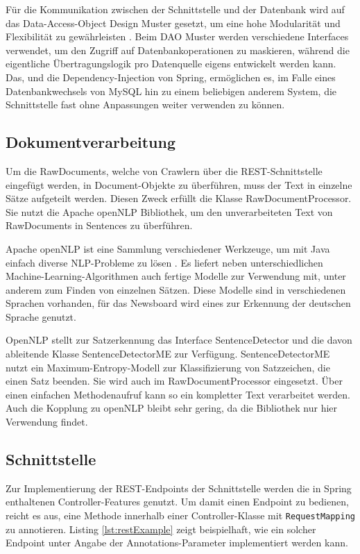 Für die Kommunikation zwischen der Schnittstelle und der Datenbank wird auf das
Data-Access-Object Design Muster gesetzt, um eine hohe Modularität und Flexibilität zu
gewährleisten \cite{dao-pattern}. Beim DAO Muster werden verschiedene Interfaces
verwendet, um den Zugriff auf Datenbankoperationen zu maskieren, während die eigentliche
Übertragungslogik pro Datenquelle eigens entwickelt werden kann. Das, und die
Dependency-Injection von Spring, ermöglichen es, im Falle eines Datenbankwechsels von
MySQL hin zu einem beliebigen anderem System, die Schnittstelle fast ohne Anpassungen
weiter verwenden zu können.

\subsection{Dokumentverarbeitung}
Um die RawDocuments, welche von Crawlern über die REST-Schnittstelle eingefügt werden,
in Document-Objekte zu überführen, muss der Text in einzelne Sätze aufgeteilt werden.
Diesen Zweck erfüllt die Klasse RawDocumentProcessor. Sie nutzt die
Apache openNLP Bibliothek, um den unverarbeiteten Text von RawDocuments in Sentences zu
überführen.

Apache openNLP ist eine Sammlung verschiedener Werkzeuge, um mit Java einfach diverse 
NLP-Probleme zu lösen \cite{opennlp}. Es liefert neben unterschiedlichen 
Machine-Learning-Algorithmen auch fertige Modelle zur Verwendung mit, unter anderem
zum Finden von einzelnen Sätzen. Diese Modelle sind in verschiedenen Sprachen vorhanden,
für das Newsboard wird eines zur Erkennung der deutschen Sprache genutzt.

OpenNLP stellt zur Satzerkennung das Interface SentenceDetector und die davon ableitende
Klasse SentenceDetectorME zur Verfügung. SentenceDetectorME nutzt ein Maximum-Entropy-Modell
zur Klassifizierung von Satzzeichen, die einen Satz beenden. Sie wird auch im
RawDocumentProcessor eingesetzt. Über einen einfachen Methodenaufruf kann so ein kompletter
Text verarbeitet werden. Auch die Kopplung zu openNLP bleibt sehr gering, da die
Bibliothek nur hier Verwendung findet.

\subsection{Schnittstelle}
Zur Implementierung der REST-Endpoints der Schnittstelle werden die in Spring enthaltenen
Controller-Features genutzt. Um damit einen Endpoint zu bedienen, reicht es aus,
eine Methode innerhalb einer Controller-Klasse mit \texttt{RequestMapping} zu annotieren.
Listing \ref{lst:restExample} zeigt beispielhaft, wie ein solcher Endpoint unter Angabe der
Annotations-Parameter implementiert werden kann.

